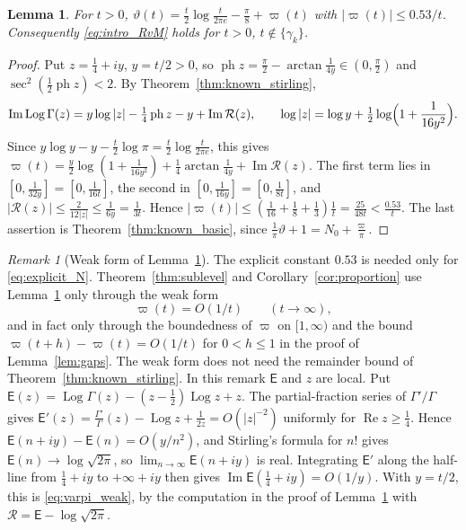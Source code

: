 \documentclass[11pt,a4paper]{article}
\makeatletter
\numberwithin{equation}{section}
\DeclareRobustCommand{\CGref}[1]{\ref{#1}}
\DeclareRobustCommand{\CGeqref}[1]{\eqref{#1}}
\let\CG@origref\ref
\let\CG@origeqref\eqref
\newcommand{\CG@gettip}[1]{\@ifundefined{CGTip@#1}{#1}{\csname CGTip@#1\endcsname}}
\DeclareRobustCommand{\CGref}[1]{\pdftooltip{\CG@origref{#1}}{\CG@gettip{#1}}}
\DeclareRobustCommand{\CGeqref}[1]{\pdftooltip{\CG@origeqref{#1}}{\CG@gettip{#1}}}
\newtheorem{lemma}[theorem]{Lemma}
\theoremstyle{definition}
\theoremstyle{remark}
\newtheorem{remark}[theorem]{Remark}
\newcommand{\Nz}{N_0} %
\makeatother
\begin{document}
\begin{lemma}\label{lem:varpi}
For $t>0$, $\vartheta(t)=\frac t2\log\frac t{2\pi e}-\frac\pi8+\varpi(t)$ with $|\varpi(t)|\le0.53/t$. Consequently \CGeqref{eq:intro_RvM} holds for $t>0$, $t\notin\{\gamma_k\}$.
\end{lemma}

\begin{proof}
Put $z=\frac14+iy$, $y=t/2>0$, so $\operatorname{ph}z=\frac\pi2-\arctan\frac1{4y}\in(0,\frac\pi2)$ and $\sec^2(\frac12\operatorname{ph}z)<2$. By Theorem~\CGref{thm:known_stirling},
\begin{equation}
\operatorname{Im}\operatorname{Log}\Gamma(z)=y\log|z|-\tfrac14\operatorname{ph}z-y+\operatorname{Im}\mathcal R(z),\qquad \log|z|=\log y+\tfrac12\log\Bigl(1+\frac1{16y^2}\Bigr).
\label{eq:disp_10}
\end{equation}
Since $y\log y-y-\frac t2\log\pi=\frac t2\log\frac t{2\pi e}$, this gives $\varpi(t)=\frac y2\log(1+\frac1{16y^2})+\frac14\arctan\frac1{4y}+\operatorname{Im}\mathcal R(z)$. The first term lies in $[0,\frac1{32y}]=[0,\frac1{16t}]$, the second in $[0,\frac1{16y}]=[0,\frac1{8t}]$, and $|\mathcal R(z)|\le\frac2{12|z|}\le\frac1{6y}=\frac1{3t}$. Hence $|\varpi(t)|\le(\frac1{16}+\frac18+\frac13)\frac1t=\frac{25}{48t}<\frac{0.53}t$. The last assertion is Theorem~\CGref{thm:known_basic}, since $\frac1\pi\vartheta+1=\Nz+\frac\varpi\pi$.
\end{proof}

\begin{remark}[Weak form of Lemma~\ref{lem:varpi}]\label{rem:varpi_weak}
The explicit constant $0.53$ is needed only for \CGeqref{eq:explicit_N}. Theorem~\CGref{thm:sublevel} and Corollary~\CGref{cor:proportion} use Lemma~\CGref{lem:varpi} only through the weak form
\begin{equation}
\varpi(t)=O(1/t)\qquad(t\to\infty),
\label{eq:varpi_weak}
\end{equation}
and in fact only through the boundedness of $\varpi$ on $[1,\infty)$ and the bound $\varpi(t+h)-\varpi(t)=O(1/t)$ for $0<h\le1$ in the proof of Lemma~\CGref{lem:gaps}. The weak form does not need the remainder bound of Theorem~\CGref{thm:known_stirling}. In this remark $\mathsf E$ and $z$ are local. Put $\mathsf E(z)=\operatorname{Log}\Gamma(z)-(z-\frac12)\operatorname{Log}z+z$. The partial-fraction series of $\Gamma'/\Gamma$ gives $\mathsf E'(z)=\frac{\Gamma'}\Gamma(z)-\operatorname{Log}z+\frac1{2z}=O(|z|^{-2})$ uniformly for $\operatorname{Re}z\ge\frac14$. Hence $\mathsf E(n+iy)-\mathsf E(n)=O(y/n^2)$, and Stirling's formula for $n!$ gives $\mathsf E(n)\to\log\sqrt{2\pi}$, so $\lim_{n\to\infty}\mathsf E(n+iy)$ is real. Integrating $\mathsf E'$ along the half-line from $\frac14+iy$ to $+\infty+iy$ then gives $\operatorname{Im}\mathsf E(\frac14+iy)=O(1/y)$. With $y=t/2$, this is \CGeqref{eq:varpi_weak}, by the computation in the proof of Lemma~\CGref{lem:varpi} with $\mathcal R=\mathsf E-\log\sqrt{2\pi}$.
\end{remark}
\end{document}
